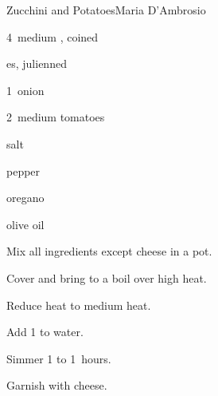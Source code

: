 \begin{recipe}{Zucchini and Potatoes}{Maria D'Ambrosio}{}

\begin{ingredients}
\item 4~medium , coined
\item {}es, julienned
\item 1~onion
\item 2~medium tomatoes
\item salt
\item pepper
\item oregano
\item olive oil
\item {}
\end{ingredients}

\begin{directions}
\item Mix all ingredients except cheese in a pot.
\item Cover and bring to a boil over high heat.
\item Reduce heat to medium heat.
\item Add 1 to  water.
\item Simmer 1 to 1\half~hours.
\item Garnish with cheese.
\end{directions}

\end{recipe}
